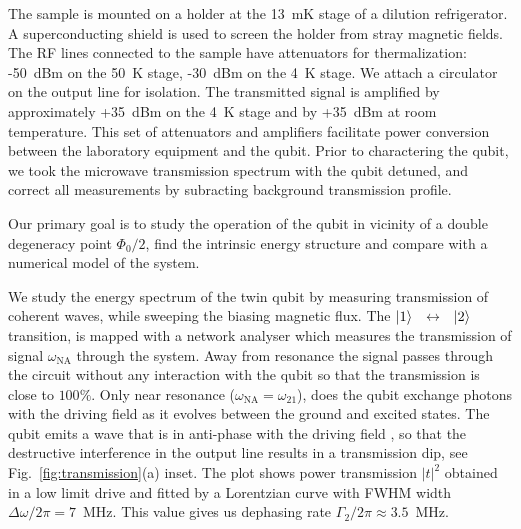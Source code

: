 \documentclass[%
reprint,
superscriptaddress,
bibnotes,
amsmath,
amssymb,
aps,
showkeys,
prb,
]{revtex4-1}
\newcommand{\iket}[1]{\ensuremath{\Ket{#1}}}
\newcommand{\ilra}{\ensuremath{\,\leftrightarrow\,}}
\begin{document}
The sample is mounted on a holder at the 13~mK
stage of  a dilution refrigerator.  A  superconducting shield is used  to screen
the holder  from stray magnetic  fields.  The RF  lines connected to  the sample
have attenuators for thermalization: -50~dBm on  the 50~K stage, -30~dBm on the
4~K  stage.  We  attach a  circulator on  the output  line for  isolation.  The
transmitted signal is amplified  by approximately +35~dBm on the 4~K stage  and by +35~dBm at
room  temperature.  This  set  of attenuators  and  amplifiers facilitate  power
conversion  between the  laboratory equipment  and the qubit.  Prior  to
charactering the qubit,  we  took  the microwave  transmission
spectrum with the qubit detuned, and  correct all measurements by subracting background
transmission profile.

Our primary goal  is to study the operation of the qubit in vicinity of a double degeneracy point $\Phi_0/2$, find the intrinsic energy structure and  compare with a numerical model of the system.

We study the energy  spectrum  of the  twin qubit  by measuring transmission of coherent waves,  while  sweeping  the  biasing  magnetic flux.
The  \iket{1}~\ilra~\iket{2}  transition, is  mapped  with a  network
analyser which measures  the transmission of signal  $\omega_{\text{NA}}$ through the
system.
Away from  resonance the signal passes through the  circuit without any
interaction with the qubit so that the transmission
is close to  $ 100\% $.  Only near resonance  ($\omega_{\text{NA}}=\omega_{21}$), does the
qubit exchange photons  with the driving field as it  evolves between the ground
and excited states.  The  qubit emits a wave that is in anti-phase with
the driving  field \cite{Astafiev_2010}, so that the  destructive interference in
the output line results in  a transmission dip, see Fig.~\ref{fig:transmission}(a) inset. The plot shows power transmission $|t|^2$ obtained in a low limit drive and fitted by a Lorentzian curve with FWHM width $\Delta\omega/2\pi = 7$~MHz. This value gives us dephasing rate $\Gamma_2/2\pi \approx 3.5$~MHz.
\end{document}
